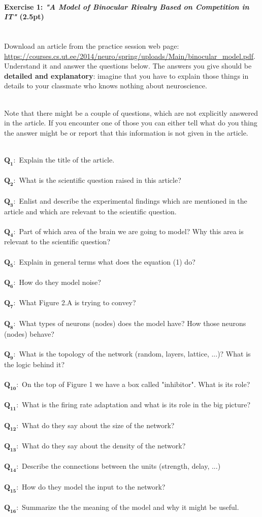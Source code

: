 \documentclass[a4paper,11pt]{article}
\newenvironment{exercise}[3]{\paragraph{Exercise #1: #2 (#3pt)}\ \\}{
\medskip}
\newcommand{\question}[2]{\setlength\parindent{0mm}\ \\$\mathbf{Q_{#1}:}$ #2\ \\}
\begin{document}
%
%
\begin{exercise}{1}{\textit{"A Model of Binocular Rivalry Based on Competition in IT"}}{2.5}
Download an article from the practice session web page: \url{https://courses.cs.ut.ee/2014/neuro/spring/uploads/Main/binocular_model.pdf}. Understand it and answer the questions below. The answers you give should be \textbf{detailed and explanatory}: imagine that you have to explain those things in details to your classmate who knows nothing about neuroscience.

\ \\
Note that there might be a couple of questions, which are not explicitly answered in the article. If you encounter one of those you can either tell what do you thing the answer might be or report that this information is not given in the article.

\question{1}{Explain the title of the article.}
\question{2}{What is the scientific question raised in this article?}
\question{3}{Enlist and describe the experimental findings which are mentioned in the article and which are relevant to the scientific question.}
\question{4}{Part of which area of the brain we are going to model? Why this area is relevant to the scientific question?}
\question{5}{Explain in general terms what does the equation (1) do?}
\question{6}{How do they model noise?}
\question{7}{What Figure 2.A is trying to convey?}
\question{8}{What types of neurons (nodes) does the model have? How those neurons (nodes) behave?}
\question{9}{What is the topology of the network (random, layers, lattice, ...)? What is the logic behind it?}
\question{10}{On the top of Figure 1 we have a box called "inhibitor". What is its role?}
\question{11}{What is the firing rate adaptation and what is its role in the big picture?}
\question{12}{What do they say about the size of the network?}
\question{13}{What do they say about the density of the network?}
\question{14}{Describe the connections between the units (strength, delay, ...)}
\question{15}{How do they model the input to the network?}
\question{16}{Summarize the the meaning of the model and why it might be useful.}

\end{exercise}
\end{document}
